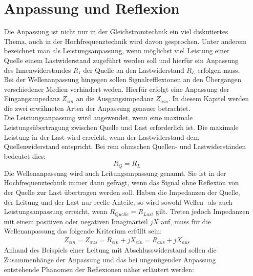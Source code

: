 \section{Anpassung und Reflexion}\label{sec:AnpassungReflexionen}
Die Anpassung ist nicht nur in der Gleichstromtechnik ein viel diskutiertes Thema, auch in der Hochfrequenztechnik wird davon gesprochen. Unter anderem bezeichnet man als Leistungsanpassung, wenn möglichst viel Leistung einer Quelle einem Lastwiderstand zugeführt werden soll und hierfür ein Anpassung des Innenwiderstandes $R_I$ der Quelle an den Lastwiderstand $R_L$ erfolgen muss. Bei der  Wellenanpassung hingegen sollen Signalrefflexionen an den Übergängen verschiedener Medien verhindert weden. Hierfür erfolgt eine Anpassung der Eingangsimpedanz $Z_{ein}$ an die Ausgangsimpedanz $Z_{aus}$. 
In diesem Kapitel werden die zwei erwähneten Arten der Anpassung genauer betrachtet.\\

Die Leistungsanpassung wird angewendet, wenn eine maximale Leistungsübertragung zwischen Quelle und Last erforderlich ist. Die maximale Leistung in der Last wird erreicht, wenn der Lastwiderstand dem Quellenwiderstand entspricht. Bei rein ohmschen Quellen- und Lastwiderständen bedeutet dies:\\
\[R_{Q} = R_{L}\]
Die Wellenanpassung wird auch Leitungsanpassung genannt. Sie ist in der Hochfrequenztechnik immer dann gefragt, wenn das Signal ohne Reflexion von der Quelle zur Last übertragen werden soll. Haben die Impedanzen der Quelle, der Leitung und der Last nur reelle Anteile, so wird sowohl Wellen- als auch Leistungsanpassung erreicht, wenn $R_{Quelle} = R_{Last}$ gilt. Treten jedoch Impedanzen mit einem positiven oder negativen Imaginärteil $jX$ auf, muss für die Wellenanpassung das folgende Kriterium erfüllt sein:
\begin{eqnarray}\label{eq:ZeinZaus}
Z_{ein} = Z_{aus} = R_{ein} +jX_{ein} = R_{aus} + jX_{aus}
\end{eqnarray}
Anhand des Beispiels einer Leitung mit Abschlusswiderstand sollen die Zusammenhänge der Anpassung und das bei ungenügender Anpassung  entstehende Phänomen der Reflexionen näher erläutert werden: \\

